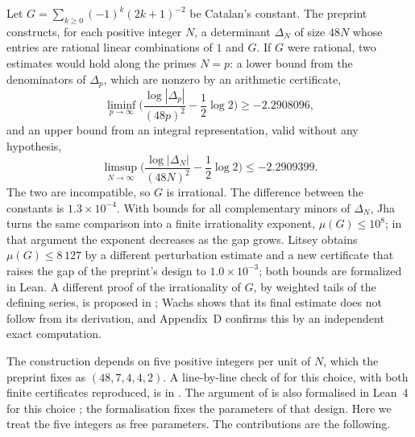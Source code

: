 \documentclass[11pt]{article}
\theoremstyle{definition}
\begin{document}
Let $G=\sum_{k\ge0}(-1)^k(2k+1)^{-2}$ be Catalan's constant. The preprint \cite{OAI} constructs, for each positive integer $N$, a determinant $\Delta_N$ of size $48N$ whose entries are rational linear combinations of $1$ and $G$. If $G$ were rational, two estimates would hold along the primes $N=p$: a lower bound from the denominators of $\Delta_p$, which are nonzero by an arithmetic certificate,
\[
\liminf_{p\to\infty}\Big(\frac{\log|\Delta_p|}{(48p)^2}-\frac12\log2\Big)\ge-2.2908096,
\]
and an upper bound from an integral representation, valid without any hypothesis,
\[
\limsup_{N\to\infty}\Big(\frac{\log|\Delta_N|}{(48N)^2}-\frac12\log2\Big)\le-2.2909399 .
\]
The two are incompatible, so $G$ is irrational. The difference between the constants is $1.3\times10^{-4}$. With bounds for all complementary minors of $\Delta_N$, Jha \cite{Jha} turns the same comparison into a finite irrationality exponent, $\mu(G)\le10^{8}$; in that argument the exponent decreases as the gap grows. Litsey \cite{Litsey} obtains $\mu(G)\le8\,127$ by a different perturbation estimate and a new certificate that raises the gap of the preprint's design to $1.0\times10^{-3}$; both bounds are formalized in Lean. A different proof of the irrationality of $G$, by weighted tails of the defining series, is proposed in \cite{Sun}; Wachs \cite{Wachs} shows that its final estimate does not follow from its derivation, and Appendix~D confirms this by an independent exact computation.

The construction depends on five positive integers per unit of $N$, which the preprint fixes as $(48,7,4,4,2)$. A line-by-line check of \cite{OAI} for this choice, with both finite certificates reproduced, is in \cite{MCSC}. The argument of \cite{OAI} is also formalised in Lean~4 for this choice \cite{OAILean}; the formalisation fixes the parameters of that design. Here we treat the five integers as free parameters. The contributions are the following.
\end{document}

